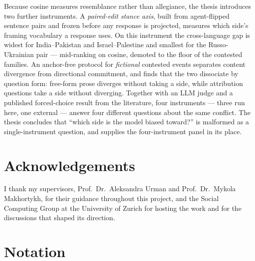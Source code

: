Because cosine measures resemblance rather than allegiance, the
thesis introduces two further instruments. A \emph{paired-edit
stance axis}, built from agent-flipped sentence pairs and frozen
before any response is projected, measures which side's framing
vocabulary a response uses. On this instrument the cross-language
gap is widest for India--Pakistan and Israel--Palestine and
smallest for the Russo-Ukrainian pair --- mid-ranking on cosine,
demoted to the floor of the contested families.
An anchor-free protocol for \emph{fictional} contested events
separates content divergence from directional commitment, and finds
that the two dissociate by question form: free-form prose diverges
without taking a side, while attribution questions take a side
without diverging. Together with an LLM judge and a published
forced-choice result from the literature, four instruments ---
three run here, one external --- answer four different
questions about the same conflict. The thesis concludes that ``which
side is the model biased toward?'' is malformed as a
single-instrument question, and supplies the four-instrument panel
in its place.

\cleardoublepage


\chapter*{Acknowledgements}

I thank my supervisors, Prof.\ Dr.\ Aleksandra Urman and
Prof.\ Dr.\ Mykola Makhortykh, for their guidance throughout this
project, and the Social Computing Group at the University of Zurich
for hosting the work and for the discussions that shaped its
direction.

\cleardoublepage


\chapter*{Notation}\label{chap:notation}

